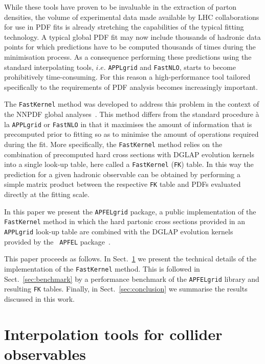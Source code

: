 \documentclass[preprint,12pt]{elsarticle}
\begin{document}
While these tools have proven to be invaluable in the extraction
of parton densities, the volume of experimental data made available by
LHC collaborations for use in PDF fits is already stretching the
capabilities of the typical fitting technology. A typical
global PDF fit may now include thousands of hadronic data points for which
predictions have to be computed thousands of times during the
minimisation process. As a consequence performing these predictions
using the standard interpolating tools, $i.e.$
{\tt APPLgrid} and {\tt FastNLO}, starts to become prohibitively time-consuming.
For this reason a high-performance tool tailored specifically to the requirements of PDF analysis becomes increasingly
important.

The {\tt FastKernel} method was developed to
address this problem in the context of the NNPDF global analyses~\cite{Ball:2014uwa}. This method differs from the standard procedure
\`{a} la {\tt APPLgrid} or {\tt FastNLO} in that it maximises the
amount of information that is precomputed prior to fitting so as to
minimise the amount of operations required during the
fit. More specifically, the {\tt FastKernel} method relies on the
combination of precomputed hard cross sections with DGLAP evolution
kernels into a single look-up table, here called
a {\tt FastKernel} ({\tt FK}) table. In this way the prediction
for a given hadronic observable can be obtained by performing a simple matrix
product between the respective {\tt FK} table and PDFs evaluated directly at the fitting scale.

In this paper we present the {\tt APFELgrid} package, a public
implementation of the {\tt FastKernel} method in which the hard
partonic cross sections provided in an {\tt APPLgrid} look-up table
are combined with the DGLAP evolution kernels provided by the {\tt
  APFEL}
package~\cite{Bertone:2013vaa}.

This paper proceeds as follows. In
Sect.~\ref{sec:FastKernel} we present the technical details of the
implementation of the {\tt FastKernel} method. This is followed in
Sect.~\ref{sec:benchmark} by a performance benchmark of the
{\tt APFELgrid} library and resulting {\tt FK} tables. Finally, in
Sect.~\ref{sec:conclusion} we summarise the results discussed in this
work.

\section{Interpolation tools for collider observables}\label{sec:FastKernel}
\end{document}
